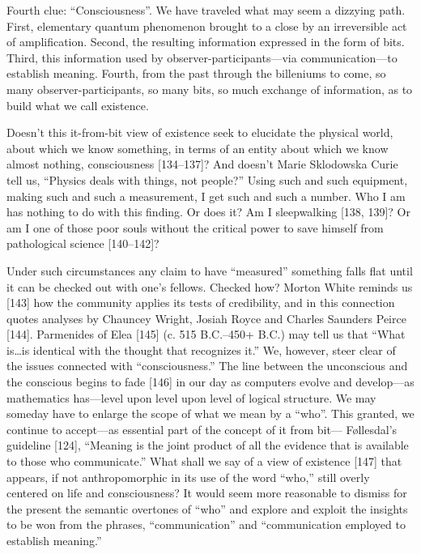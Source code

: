 \documentclass[11pt]{article}
\begin{document}
	Fourth clue: ``Consciousness''. We have traveled what may seem a dizzying path.
	First, elementary quantum phenomenon brought to a close by an irreversible act
	of amplification. Second, the resulting information expressed in the form of bits.
	Third, this information used by observer-participants---via communication---to
	establish meaning. Fourth, from the past through the billeniums to come, so many
	observer-participants, so many bits, so much exchange of information, as to build
	what we call existence.
	
	Doesn't this it-from-bit view of existence seek to elucidate the physical world,
	about which we know something, in terms of an entity about which we know almost
	nothing, consciousness [134--137]? And doesn't Marie Sklodowska Curie tell us,
	``Physics deals with things, not people?'' Using such and such equipment, making
	such and such a measurement, I get such and such a number. Who I am has nothing
	to do with this finding. Or does it? Am I sleepwalking [138, 139]? Or am I one
	of those poor souls without the critical power to save himself from pathological
	science [140--142]?
	
	Under such circumstances any claim to have ``measured'' something falls flat
	until it can be checked out with one's fellows. Checked how? Morton White reminds us [143] how the community applies its tests of credibility, and in this connection quotes analyses by Chauncey Wright, Josiah Royce and Charles Saunders
	Peirce [144]. Parmenides of Elea [145] (c. 515 B.C.--450+ B.C.) may tell us that
	``What is\ldots is identical with the thought that recognizes it.'' We, however, steer
	clear of the issues connected with ``consciousness.'' The line between the unconscious and the conscious begins to fade [146] in our day as computers evolve and
	develop---as mathematics has---level upon level upon level of logical structure.
	We may someday have to enlarge the scope of what we mean by a ``who''. This
	granted, we continue to accept---as essential part of the concept of it from bit---
	Føllesdal's guideline [124], ``Meaning is the joint product of all the evidence that is
	available to those who communicate.'' What shall we say of a view of existence [147]
	that appears, if not anthropomorphic in its use of the word ``who,'' still overly centered on life and consciousness? It would seem more reasonable to dismiss for
	the present the semantic overtones of ``who'' and explore and exploit the insights to
	be won from the phrases, ``communication'' and ``communication employed to establish meaning.''
	
\end{document}
